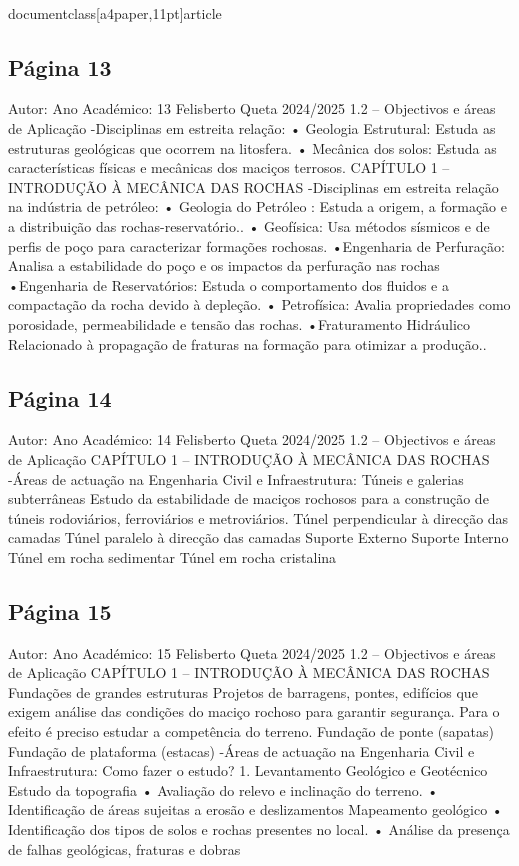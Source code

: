\\documentclass[a4paper,11pt]{article}
\begin{document}
\subsection*{Página 13}
Autor:
Ano Académico:
13
Felisberto Queta
2024/2025
1.2 – Objectivos e áreas de Aplicação
-Disciplinas em estreita relação:
• Geologia Estrutural:
Estuda as estruturas geológicas que ocorrem na litosfera.
• Mecânica dos solos:
Estuda as características físicas e mecânicas dos maciços terrosos.
CAPÍTULO 1 – INTRODUÇÃO À MECÂNICA DAS ROCHAS
-Disciplinas em estreita relação na indústria de petróleo:
• Geologia do Petróleo :
Estuda a origem, a formação e a distribuição das rochas-reservatório..
• Geofísica:
Usa métodos sísmicos e de perfis de poço para caracterizar formações rochosas.
•Engenharia
de
Perfuração:
Analisa a estabilidade do poço e os impactos da perfuração nas rochas
•Engenharia
de
Reservatórios:
Estuda o comportamento dos fluidos e a compactação da rocha devido à depleção.
• Petrofísica:
Avalia propriedades como porosidade, permeabilidade e tensão das rochas.
•Fraturamento Hidráulico
Relacionado à propagação de fraturas na formação para otimizar a produção..



\subsection*{Página 14}
Autor:
Ano Académico:
14
Felisberto Queta
2024/2025
1.2 – Objectivos e áreas de Aplicação
CAPÍTULO 1 – INTRODUÇÃO À MECÂNICA DAS ROCHAS
-Áreas de actuação na Engenharia Civil e 
Infraestrutura:
Túneis
e
galerias
subterrâneas
Estudo da estabilidade de maciços rochosos para a construção de túneis rodoviários,
ferroviários e metroviários.
Túnel perpendicular à direcção das 
camadas
Túnel paralelo à direcção das 
camadas
Suporte Externo
Suporte Interno
Túnel em rocha 
sedimentar
Túnel em rocha 
cristalina



\subsection*{Página 15}
Autor:
Ano Académico:
15
Felisberto Queta
2024/2025
1.2 – Objectivos e áreas de Aplicação
CAPÍTULO 1 – INTRODUÇÃO À MECÂNICA DAS ROCHAS
Fundações de grandes estruturas
Projetos de barragens, pontes, edifícios que exigem análise
das condições do maciço rochoso para garantir segurança.
Para o efeito é preciso estudar a competência do terreno.
Fundação de ponte (sapatas)
Fundação de plataforma (estacas)
-Áreas de actuação na Engenharia Civil e 
Infraestrutura:
Como fazer o estudo?
1. Levantamento Geológico e Geotécnico
Estudo da topografia
•
Avaliação do relevo e inclinação do terreno.
•
Identificação de áreas sujeitas a erosão e deslizamentos
Mapeamento geológico
•
Identificação dos tipos de solos e rochas presentes no local.
•
Análise da presença de falhas geológicas, fraturas e dobras
\end{document}
